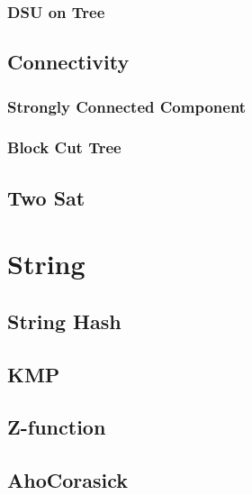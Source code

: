 \documentclass[10pt]{article}
\begin{document}
	\subsubsection{DSU on Tree}
	
	
	\subsection{Connectivity}
	
	\subsubsection{Strongly Connected Component}
	
	
	\subsubsection{Block Cut Tree}
	
	
	\subsection{Two Sat}
	
	
	
	\section{String}
	\subsection{String Hash}
	
	
	\subsection{KMP}
	
	
	\subsection{Z-function}
	
	
	\subsection{AhoCorasick}
	
	
\end{document}
